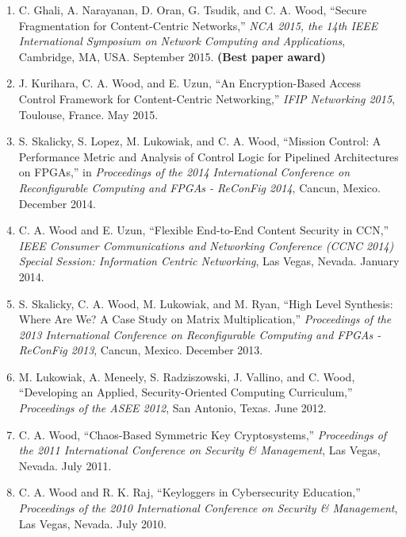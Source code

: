 \documentclass[10pt]{res}
\begin{document}
\begin{resume}
\begin{enumerate}[C-1.]
\item C. Ghali, A. Narayanan, D. Oran, G. Tsudik, and C. A. Wood, ``Secure Fragmentation for Content-Centric Networks,'' \emph{NCA 2015, the 14th IEEE International Symposium on Network Computing and Applications}, Cambridge, MA, USA. September 2015. {\color{red} {\bf (Best paper award)}}

\item J. Kurihara, C. A. Wood, and E. Uzun, ``An Encryption-Based Access Control Framework for Content-Centric Networking,'' \emph{IFIP Networking 2015}, Toulouse, France. May 2015.

\item S. Skalicky, S. Lopez, M. Lukowiak, and C. A. Wood, ``Mission Control: A Performance Metric and Analysis of Control Logic for Pipelined Architectures on FPGAs,'' in {\it Proceedings of the 2014 International Conference on Reconfigurable Computing and FPGAs - ReConFig 2014}, Cancun, Mexico. December 2014.

\item C. A. Wood and E. Uzun, ``Flexible End-to-End Content Security in CCN,'' \emph{IEEE Consumer Communications and Networking Conference (CCNC 2014) Special Session: Information Centric Networking}, Las Vegas, Nevada. January 2014.

\item S. Skalicky, C. A. Wood, M. Lukowiak, and M. Ryan, ``High Level Synthesis: Where Are We? A Case Study on Matrix Multiplication,'' \emph{Proceedings of the 2013 International Conference on Reconfigurable Computing and FPGAs - ReConFig 2013}, Cancun, Mexico. December 2013.

\item M. Lukowiak, A. Meneely, S. Radziszowski, J. Vallino, and C. Wood, ``Developing an Applied, Security-Oriented Computing Curriculum,'' \emph{Proceedings of the ASEE 2012}, San Antonio, Texas. June 2012.

\item C. A. Wood, ``Chaos-Based Symmetric Key Cryptosystems,'' \emph{Proceedings of the 2011 International Conference on Security \& Management}, Las Vegas, Nevada. July 2011.

\item C. A. Wood and R. K. Raj, ``Keyloggers in Cybersecurity Education,'' \emph{Proceedings of the 2010 International Conference on Security \& Management}, Las Vegas, Nevada. July 2010.

\end{enumerate}


\end{resume}
\end{document}
